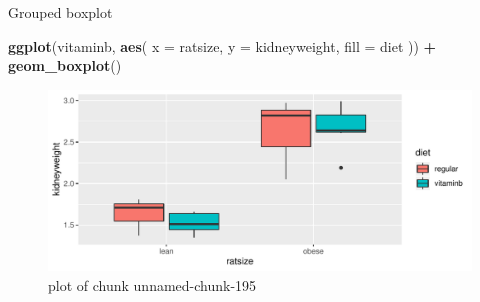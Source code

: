 \documentclass[ignorenonframetext,]{beamer}
\newenvironment{Shaded}{\begin{snugshade}}{\end{snugshade}}
\newcommand{\DataTypeTok}[1]{\textcolor[rgb]{0.13,0.29,0.53}{#1}}
\newcommand{\KeywordTok}[1]{\textcolor[rgb]{0.13,0.29,0.53}{\textbf{#1}}}
\newcommand{\NormalTok}[1]{#1}
\newcommand{\OperatorTok}[1]{\textcolor[rgb]{0.81,0.36,0.00}{\textbf{#1}}}
\newcommand{\StringTok}[1]{\textcolor[rgb]{0.31,0.60,0.02}{#1}}
\begin{document}
\begin{frame}[fragile]{Grouped boxplot}
\protect\hypertarget{grouped-boxplot}{}

\begin{Shaded}
\begin{Highlighting}[]
\KeywordTok{ggplot}\NormalTok{(vitaminb, }\KeywordTok{aes}\NormalTok{(}
  \DataTypeTok{x =}\NormalTok{ ratsize, }\DataTypeTok{y =}\NormalTok{ kidneyweight,}
  \DataTypeTok{fill =}\NormalTok{ diet}
\NormalTok{)) }\OperatorTok{+}\StringTok{ }\KeywordTok{geom_boxplot}\NormalTok{()}
\end{Highlighting}
\end{Shaded}

\begin{figure}
\centering
\includegraphics{figure/unnamed-chunk-195-1.pdf}
\caption{plot of chunk unnamed-chunk-195}
\end{figure}

\end{frame}
\end{document}
